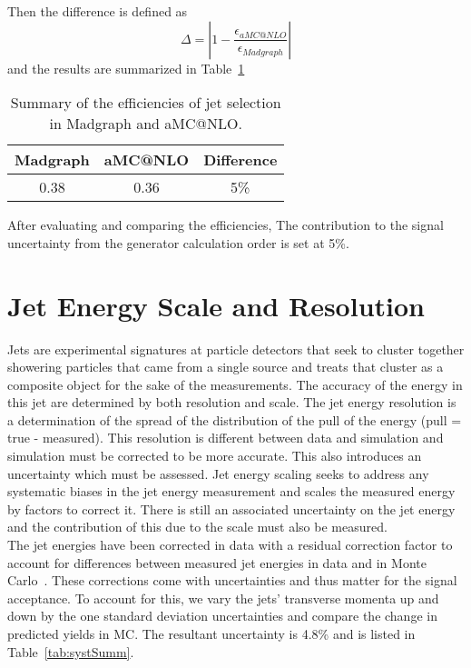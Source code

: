 Then the difference is defined as
\begin{equation}
\Delta = | 1 - \frac{\epsilon _{aMC@NLO}}{\epsilon _{Madgraph}} |
\end{equation}
and the results are summarized in Table~\ref{tab:systgeneratorsum}

\begin{table}[h]
\begin{center}

\begin{tabular}{ccc}\hline
Madgraph           &  aMC@NLO & Difference \\ \hline
0.38                      & 0.36              & 5\%\\
\hline
\end{tabular}
\caption{\label{tab:systgeneratorsum} Summary of the efficiencies of jet selection in Madgraph and aMC@NLO.}
\end{center}
\end{table}

After evaluating and comparing the efficiencies, The contribution to the signal uncertainty from the generator calculation order is set at 5\%.

\section{Jet Energy Scale and Resolution}
Jets are experimental signatures at particle detectors that seek to cluster together showering particles that came from a single source and treats that cluster as a composite object for the sake of the measurements. The accuracy of the energy in this jet are determined by both resolution and scale. The jet energy resolution is a determination of the spread of the distribution of the pull of the energy (pull = true - measured). This resolution is different between data and simulation and simulation must be corrected to be more accurate. This also introduces an uncertainty which must be assessed. Jet energy scaling seeks to address any systematic biases in the jet energy measurement and scales the measured energy by factors to correct it. There is still an associated uncertainty on the jet energy and the contribution of this due to the scale must also be measured.\\

The jet energies have been corrected in data with a residual correction factor to account for differences between measured jet energies in data and in Monte Carlo~\cite{jes_ref}. These corrections come with uncertainties and thus matter for the signal acceptance. To account for this, we vary the jets' transverse momenta up and down by the one standard deviation uncertainties and compare the change in predicted yields in MC. The resultant uncertainty is 4.8\% and is listed in Table~\ref{tab:systSumm}.\\

